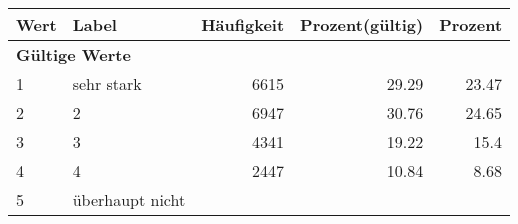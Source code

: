      \begin{longtable}{lXrrr}
     \toprule
     \textbf{Wert} & \textbf{Label} & \textbf{Häufigkeit} & \textbf{Prozent(gültig)} & \textbf{Prozent} \\
     \endhead
     \midrule
     \multicolumn{5}{l}{\textbf{Gültige Werte}}\\

     1 &
     \multicolumn{1}{X}{ sehr stark   } &


       \num{6615} &
       \num[round-mode=places,round-precision=2]{29.29} &
         \num[round-mode=places,round-precision=2]{23.47} \\

     2 &
     \multicolumn{1}{X}{ 2   } &


       \num{6947} &
       \num[round-mode=places,round-precision=2]{30.76} &
         \num[round-mode=places,round-precision=2]{24.65} \\

     3 &
     \multicolumn{1}{X}{ 3   } &


       \num{4341} &
       \num[round-mode=places,round-precision=2]{19.22} &
         \num[round-mode=places,round-precision=2]{15.4} \\

     4 &
     \multicolumn{1}{X}{ 4   } &


       \num{2447} &
       \num[round-mode=places,round-precision=2]{10.84} &
         \num[round-mode=places,round-precision=2]{8.68} \\

     5 &
     \multicolumn{1}{X}{ überhaupt nicht   } &



\end{longtable}
